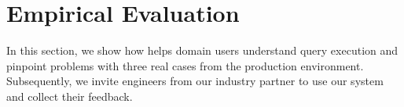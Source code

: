 \section{Empirical Evaluation}\label{sec:eval}

In this section, we show how \qevis{} helps domain users understand query execution and pinpoint problems with three real cases from the production environment. 
Subsequently, we invite engineers from our industry partner to use our system and collect their feedback.


